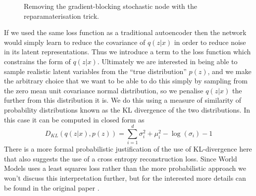 \documentclass{article}
\numberwithin{figure}{section}
\theoremstyle{definition}
\begin{document}
\begin{figure}[h]
\caption{Removing the gradient-blocking stochastic node with the reparamaterisation trick.}
\end{figure}

If we used the same loss function as a traditional autoencoder then the network would simply learn to reduce the covariance of $q(z|x)$ in order to reduce noise in its latent representations.
Thus we introduce a term to the loss function which constrains the form of $q(z|x)$.
Ultimately we are interested in being able to sample realistic latent variables from the ``true distribution'' $p(z)$, and we make the arbitrary choice that we want to be able to do this simply by sampling from the zero mean unit covariance normal distribution, so we penalise $q(z|x)$ the further from this distribution it is.
We do this using a measure of similarity of probability distributions known as the KL divergence of the two distributions.
In this case it can be computed in closed form as
$$D_{KL}(q(z|x),p(z)) = \sum_{i=1}^d \sigma_i^2 + \mu_i^2 - \log(\sigma_i)-1$$
There is a more formal probabilistic justification of the use of KL-divergence here that also suggests the use of a cross entropy reconstruction loss.
Since World Models uses a least squares loss rather than the more probabilistic approach we won't discuss this interpretation further, but for the interested more details can be found in the original paper \citep{kingma2013auto}.
\end{document}
